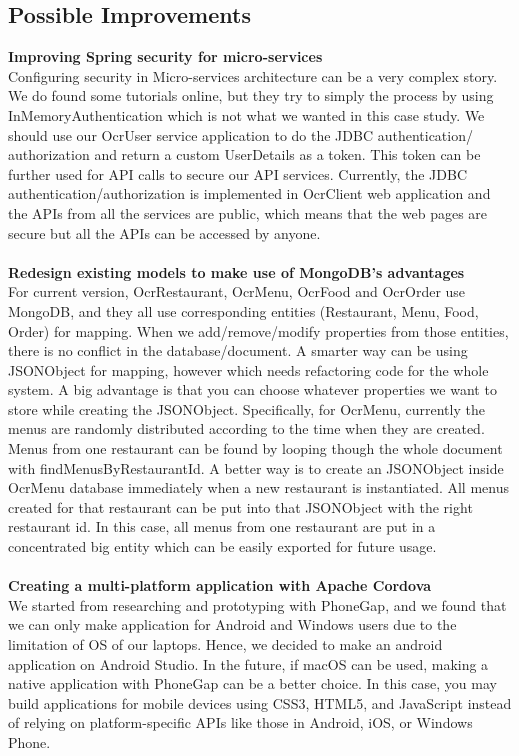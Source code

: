 \documentclass[12pt]{article}
\begin{document}
\begin{multicols}{2}

\subsection{Possible Improvements}
\noindent\textbf{Improving Spring security for micro-services}
\\
Configuring security in Micro-services architecture can be a very complex story. We do found some tutorials online, but they try to simply the process by using InMemoryAuthentication which is not what we wanted in this case study. We should use our OcrUser service application to do the JDBC authentication/ authorization and return a custom UserDetails as a token. This token can be further used for API calls to secure our API services. Currently, the JDBC authentication/authorization is implemented in OcrClient web application and the APIs from all the services are public, which means that the web pages are secure but all the APIs can be accessed by anyone.
\\\\
\noindent\textbf{Redesign existing models to make use of MongoDB's advantages}
\\For current version, OcrRestaurant, OcrMenu, OcrFood and OcrOrder use MongoDB, and they all use corresponding entities (Restaurant, Menu, Food, Order) for mapping. When we add/remove/modify properties from those entities, there is no conflict in the database/document. A smarter way can be using JSONObject for mapping, however which needs refactoring code for the whole system. A big advantage is that you can choose whatever properties we want to store while creating the JSONObject.
Specifically, for OcrMenu, currently the menus are randomly distributed according to the time when they are created. Menus from one restaurant can be found by looping though the whole document with findMenusByRestaurantId. A better way is to create an JSONObject inside OcrMenu database immediately when a new restaurant is instantiated. All menus created for that restaurant can be put into that JSONObject with the right restaurant id. In this case, all menus from one restaurant are put in a concentrated big entity which can be easily exported for future usage. 
\\\\
\noindent\textbf{Creating a multi-platform application with Apache Cordova}
\\
We started from researching and prototyping with PhoneGap, and we found that we can only make application for Android and Windows users due to the limitation of OS of our laptops. Hence, we decided to make an android application on Android Studio. In the future, if macOS can be used, making a native application with PhoneGap can be a better choice. In this case, you may build applications for mobile devices using CSS3, HTML5, and JavaScript instead of relying on platform-specific APIs like those in Android, iOS, or Windows Phone.

\end{multicols}
\end{document}
